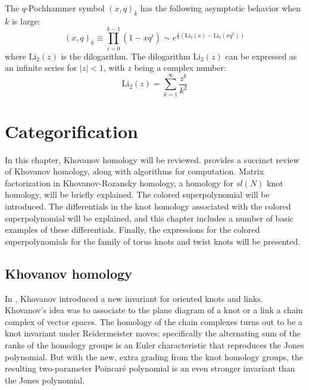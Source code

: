 \documentclass[a4paper,titlepage,twoside]{book}
\begin{document}
The $q$-Pochhammer symbol $(x,q)_k$ has the following asymptotic behavior when $k$ is large:
\begin{equation}
  (x,q)_k \equiv \prod_{i=0}^{k-1}{ (1-xq^i )} \sim e^{ \frac{1}{ \hbar}{ ( \text{Li}_2{ (x)} - \text{Li}_2{ (xq^k)} ) } } \label{Eq:qPochhammerasymptotics}
\end{equation}
where $\text{Li}_2{(z)}$ is the dilogarithm.  The dilogarithm $\text{Li}_2(z)$ can be expressed as an infinite series for $|z| <1$, with $z$ being a complex number:
\begin{equation}
  \text{Li}_2{ (z) } = \sum_{k=1}^{\infty} \frac{z^k}{k^2 }
\end{equation}


\chapter{Categorification} \label{chap:Categorification}

In this chapter, Khovanov homology will be reviewed.  \cite{Bar-Natan2002} provides a succinct review of Khovanov homology, along with algorithms for computation.  Matrix factorization in Khovanov-Rozansky homology, a homology for $sl{(N)}$ knot homology, will be briefly explained.  The colored superpolynomial will be introduced.  The differentials in the knot homology associated with the colored superpolynomial will be explained, and this chapter includes a number of basic examples of these differentials.  Finally, the expressions for the colored superpolynomials for the family of torus knots and twist knots will be presented.  


\section{Khovanov homology}


In \cite{Khovanov2000}, Khovanov introduced a new invariant for oriented knots and links.  Khovanov's idea was to associate to the plane diagram of a knot or a link a chain complex of vector spaces.  The homology of the chain complexes turns out to be a knot invariant under Reidermeister moves; specifically the alternating sum of the ranks of the homology groups is an Euler characteristic that reproduces the Jones polynomial.  But with the new, extra grading from the knot homology groups, the resulting two-parameter Poincar\'{e} polynomial is an even stronger invariant than the Jones polynomial.  
\end{document}
